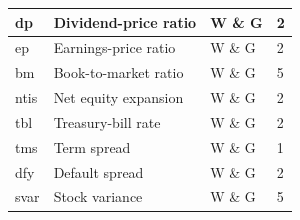 \documentclass[11pt]{article}
\theoremstyle{plain}
\theoremstyle{definition}
\theoremstyle{remark}
\numberwithin{equation}{section}
\begin{document}
{\begin{longtable}{|l|l|l|l|}
dp & Dividend-price ratio & W \& G & 2 \\ \hline
ep & Earnings-price ratio & W \& G & 2 \\ \hline
bm & Book-to-market ratio & W \& G  & 5 \\ \hline
ntis & Net equity expansion & W \& G & 2 \\ \hline
tbl & Treasury-bill rate & W \& G  & 2 \\ \hline
tms & Term spread & W \& G  & 1 \\ \hline
dfy & Default spread & W \& G  & 2 \\ \hline
svar & Stock variance & W \& G & 5 \\ \hline
\end{longtable}
}
\end{document}
